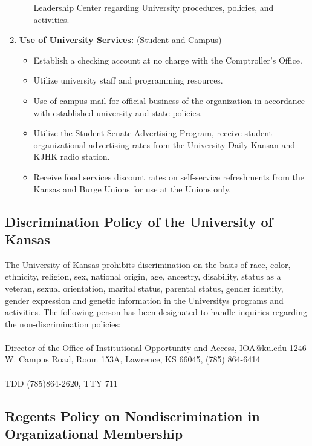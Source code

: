 \begin{enumerate}
\begin{itemize}
          Leadership Center regarding University procedures, policies, and
          activities.
  \end{itemize}
  \item \textbf{Use of University Services:} (Student and Campus)
  \begin{itemize}
    \item Establish a checking account at no charge with the Comptroller's
          Office.
    \item Utilize university staff and programming resources.
    \item Use of campus mail for official business of the organization in
          accordance with established university and state policies.
    \item Utilize the Student Senate Advertising Program, receive student
          organizational advertising rates from the University Daily Kansan and
          KJHK radio station.
    \item Receive food services discount rates on self-service refreshments from
          the Kansas and Burge Unions for use at the Unions only.
  \end{itemize}
\end{enumerate}


\subsection{Discrimination Policy of the University of Kansas}

The University of Kansas prohibits discrimination on the basis of race, color,
ethnicity, religion, sex, national origin, age, ancestry, disability, status as
a veteran, sexual orientation, marital status, parental status, gender identity,
gender expression and genetic information in the University\’s programs and
activities. The following person has been designated to handle inquiries
regarding the non-discrimination policies:
\\
\\
Director of the Office of Institutional Opportunity and Access, IOA@ku.edu
1246 W. Campus Road, Room 153A, Lawrence, KS 66045, (785) 864-6414
\\
\\
TDD (785)864-2620, TTY 711

\subsection{Regents Policy on Nondiscrimination in Organizational Membership}

